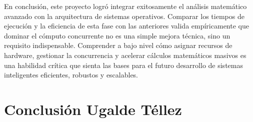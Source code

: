 En conclusión, este proyecto logró integrar exitosamente el análisis matemático avanzado con la arquitectura de sistemas operativos. Comparar los tiempos de ejecución y la eficiencia de esta fase con las anteriores valida empíricamente que dominar el cómputo concurrente no es una simple mejora técnica, sino un requisito indispensable. Comprender a bajo nivel cómo asignar recursos de hardware, gestionar la concurrencia y acelerar cálculos matemáticos masivos es una habilidad crítica que sienta las bases para el futuro desarrollo de sistemas inteligentes eficientes, robustos y escalables.

\clearpage

\section*{Conclusión Ugalde Téllez}

